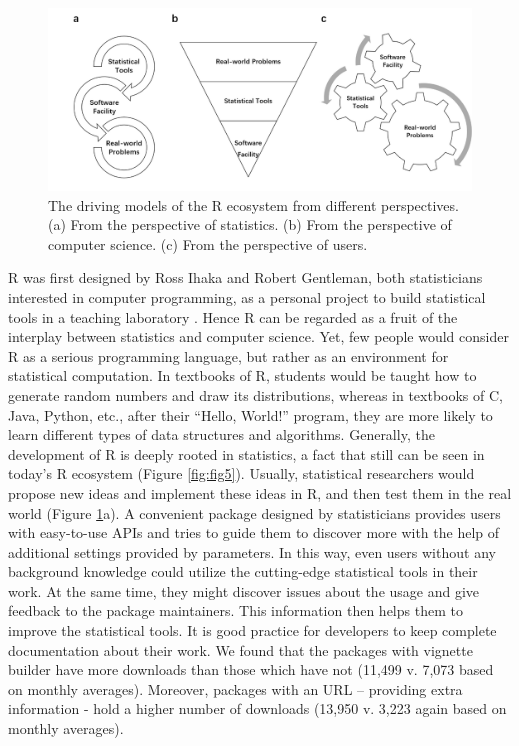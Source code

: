 \begin{Schunk}
\begin{figure}
\includegraphics[width=1\linewidth,height=0.3\textheight]{fig7} \caption[The driving models of the R ecosystem from different perspectives]{The driving models of the R ecosystem from different perspectives. (a) From the perspective of statistics. (b) From the perspective of computer science. (c) From the perspective of users. }\label{fig:fig7}
\end{figure}
\end{Schunk}

R was first designed by Ross Ihaka and Robert Gentleman, both
statisticians interested in computer programming, as a personal project
to build statistical tools in a teaching laboratory \citep{Ihaka-500}.
Hence R can be regarded as a fruit of the interplay between statistics
and computer science. Yet, few people would consider R as a serious
programming language, but rather as an environment for statistical
computation. In textbooks of R, students would be taught how to generate
random numbers and draw its distributions, whereas in textbooks of C,
Java, Python, etc., after their ``Hello, World!'' program, they are more
likely to learn different types of data structures and algorithms.
Generally, the development of R is deeply rooted in statistics, a fact
that still can be seen in today's R ecosystem (Figure \ref{fig:fig5}).
Usually, statistical researchers would propose new ideas and implement
these ideas in R, and then test them in the real world (Figure
\ref{fig:fig7}a). A convenient package designed by statisticians
provides users with easy-to-use APIs and tries to guide them to discover
more with the help of additional settings provided by parameters. In
this way, even users without any background knowledge could utilize the
cutting-edge statistical tools in their work. At the same time, they
might discover issues about the usage and give feedback to the package
maintainers. This information then helps them to improve the statistical
tools. It is good practice for developers to keep complete documentation
about their work. We found that the packages with vignette builder have
more downloads than those which have not (11,499 v. 7,073 based on
monthly averages). Moreover, packages with an URL -- providing extra
information - hold a higher number of downloads (13,950 v. 3,223 again
based on monthly averages).

